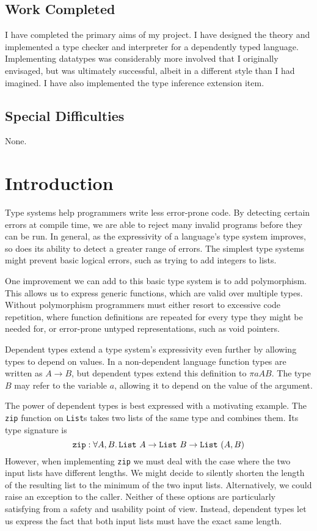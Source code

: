 \documentclass[12pt,a4paper,twoside]{report}
\begin{document}
\section*{Work Completed}

I have completed the primary aims of my project.
I have designed the theory and implemented a type checker and interpreter for a dependently typed language.
Implementing datatypes was considerably more involved that I originally envisaged, but was ultimately successful, albeit in a different style than I had imagined.
I have also implemented the type inference extension item.

\section*{Special Difficulties}

None.

\tableofcontents

\chapter{Introduction}
\pagestyle{headings}

Type systems help programmers write less error-prone code.
By detecting certain errors at compile time, we are able to reject many invalid programs before they can be run.
In general, as the expressivity of a language's type system improves, so does its ability to detect a greater range of errors.
The simplest type systems might prevent basic logical errors, such as trying to add integers to lists.

One improvement we can add to this basic type system is to add polymorphism.
This allows us to express generic functions, which are valid over multiple types.
Without polymorphism programmers must either resort to excessive code repetition, where function definitions are repeated for every type they might be needed for, or error-prone untyped representations, such as void pointers.

Dependent types extend a type system's expressivity even further by allowing types to depend on values.
In a non-dependent language function types are written as \(A \rightarrow B\), but dependent types extend this definition to \(\pi{a}{A}{B}\).
The type \(B\) may refer to the variable \(a\), allowing it to depend on the value of the argument.

The power of dependent types is best expressed with a motivating example.
The \texttt{zip} function on \texttt{List}s takes two lists of the same type and combines them.
Its type signature is
\[
    \texttt{zip} : \forall A, B \ldotp \texttt{List}\ A \rightarrow \texttt{List}\ B \rightarrow \texttt{List}\ (A, B)
\]
However, when implementing \texttt{zip} we must deal with the case where the two input lists have different lengths.
We might decide to silently shorten the length of the resulting list to the minimum of the two input lists.
Alternatively, we could raise an exception to the caller.
Neither of these options are particularly satisfying from a safety and usability point of view.
Instead, dependent types let us express the fact that both input lists must have the exact same length.
\end{document}
